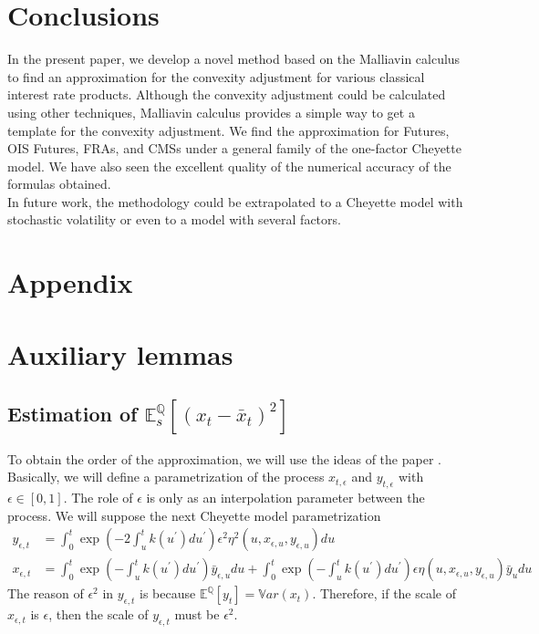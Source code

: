 \documentclass[a4paper,10pt]{article}
\newcommand{\1}{\mathbf{1}}
\begin{document}
\section{Conclusions}\label{sec:Conclusion}
In the present paper, we develop a novel method based on the Malliavin calculus to find an approximation for the convexity adjustment for various classical interest rate products. Although the convexity adjustment could be calculated using other techniques, Malliavin calculus provides a simple way to get a template for the convexity adjustment. We find the approximation for Futures, OIS Futures, FRAs, and CMSs under a general family of the one-factor Cheyette model. We have also seen the excellent quality of the numerical accuracy of the formulas obtained.\\

In future work, the methodology could be extrapolated to a Cheyette model with stochastic volatility or even to a model with several factors.


\section*{Appendix}
\appendix
\renewcommand{\thesection}{\Alph{section}.\arabic{section}}




\section{Auxiliary lemmas}
\subsection{Estimation of $\mathbb{E}_s^{\mathbb{Q}}\left[(x_t - \bar{x}_{t})^{2}\right]$}\label{estimation_error_l2}
To obtain the order of the approximation, we will use the ideas of the paper \cite{BGM}. Basically, we will define a parametrization of the process $x_{t,\epsilon}$ and $y_{t,\epsilon}$ with $\epsilon \in [0,1]$. The role of $\epsilon$ is only as an interpolation parameter between the process. We will suppose the next Cheyette model parametrization
\begin{align}\label{parametric_process}
y_{\epsilon,t} &= \int_{0}^{t} \exp\left(-2 \int_{u}^{t} k(u^{\prime}) du^{\prime}\right) \epsilon^{2} \eta^{2}(u,x_{\epsilon,u},y_{\epsilon,u}) du \\
x_{\epsilon, t} &= \int_{0}^{t} \exp\left(-\int_{u}^{t} k(u^{\prime}) du^{\prime}\right) \bar{y}_{\epsilon,u} du + \int_{0}^{t} \exp\left(-\int_{u}^{t} k(u^{\prime}) du^{\prime}\right) \epsilon \eta(u,x_{\epsilon,u},y_{\epsilon,u})  \bar{y}_u du
\end{align}
The reason of $\epsilon^{2}$ in $y_{\epsilon,t}$ is because $\mathbb{E}^{\mathbb{Q}}\left[y_t\right]= \mathbb{V}ar(x_t)$. Therefore, if the scale of $x_{\epsilon,t}$ is $\epsilon$, then the scale of $y_{\epsilon,t}$ must be $\epsilon^{2}$.\\
\end{document}

